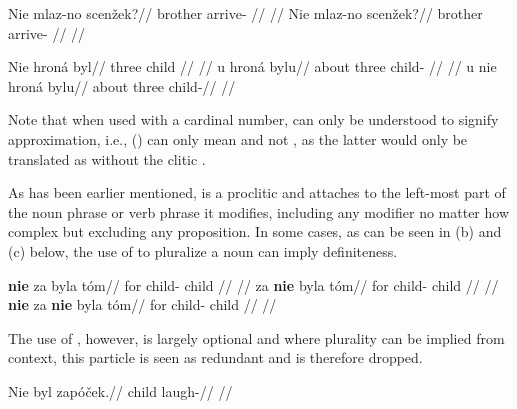 \pex
\begingl
    \gla Nie mlaz-no scen\v{z}ek?//
    \glb {} brother arrive- //
    \glft {}//
\endgl
\xe
\pex
\begingl
    \gla Nie mlaz-no scen\v{z}ek?//
    \glb {} brother arrive- //
    \glft {}//
\endgl
\xe

\pex
\a
\begingl{}
    \gla Nie hron\'a byl//
    \glb {} three child //
    \glft {}//
\endgl
\a
\begingl
    \gla u hron\'a bylu//
    \glb about three child- //
    \glft {}//
\endgl
\a
\begingl
    \gla u nie hron\'a bylu//
    \glb about  three child-//
    \glft {}//
\endgl
\xe

Note that when used with a cardinal number,  can only be understood to signify approximation, i.e., () can only mean  and not , as the latter would only be translated as  without the clitic .

As has been earlier mentioned,  is a proclitic and attaches to the left-most part of the noun phrase or verb phrase it modifies, including any modifier no matter how complex but excluding any proposition. In some cases, as can be seen in (b) and (c) below, the use of  to pluralize a noun can imply definiteness.

\pex
\a
\begingl{}
    \gla \textbf{nie} za byla t\'om//
    \glb {} for child- child //
    \glft {}//
\endgl
\a
\begingl{}
    \gla za \textbf{nie} byla t\'om//
    \glb for  child- child //
    \glft {}//
\endgl
\a
\begingl{}
    \gla \textbf{nie} za \textbf{nie} byla t\'om//
    \glb {} for  child- child //
    \glft {}//
\endgl
\xe





The use of , however, is largely optional and where plurality can be implied from context, this particle is seen as redundant and is therefore dropped.

\pex
\begingl
\gla Nie byl zap\'o\v{c}ek.//
\glb {} child laugh-//
\glft {}//
\endgl
\xe

